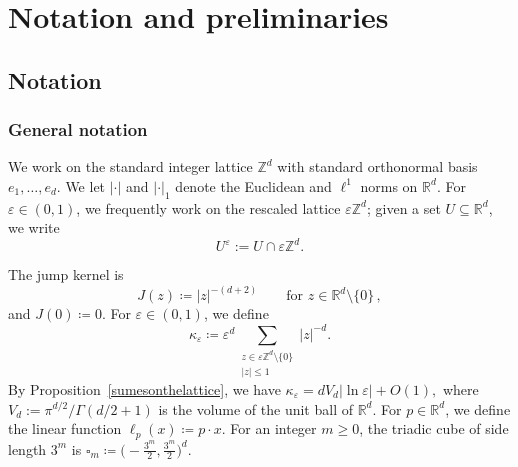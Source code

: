 \documentclass[11pt]{amsart}
\theoremstyle{plain}
\theoremstyle{definition}
\theoremstyle{remark}
\newcommand{\Zd}{\mathbb{Z}^d}
\newcommand{\Rd}{\mathbb{R}^d}
\newcommand{\R}{\mathbb{R}}
\newcommand{\cu}{\square}
\newcommand{\eps}{\varepsilon}
\begin{document}
	
	\section{Notation and preliminaries} \label{sec:notation}
	
	\subsection{Notation} \label{sec:secnotation}
	
	\subsubsection{General notation}
	We work on the standard integer lattice $\Zd$ with standard orthonormal basis $e_1, \ldots, e_d$.
	We let $|\cdot|$ and $|\cdot|_1$ denote the Euclidean and $\ell^1$ norms on $\Rd$.
	For $\eps \in (0,1)$, we frequently work on the rescaled lattice $\eps\Zd$; given a set $U \subseteq \Rd$, we write
	\[
	U^\eps := U \cap \eps \Zd.
	\]
	
	The jump kernel is
	\begin{equation}
		\label{e.J}
		J(z) \coloneqq |z|^{-(d+2)} \qquad \text{for } z \in \Rd \setminus \{0\}\,,
	\end{equation}
	and $J(0) \coloneqq 0$.
	For $\eps \in (0,1)$, we define
	\begin{equation}
		\label{e.kappaeps}
		\kappa_\eps \coloneqq \eps^d \sum_{\substack{z \in \eps\Zd \setminus \{0\} \\ |z| \le 1}} |z|^{-d}.
	\end{equation}
	By Proposition~\ref{sumesonthelattice}, we have
	$\kappa_\eps = d V_d \left| \ln\eps \right| + O(1),$
	where $V_d := \pi^{d/2} / \Gamma (d/2 + 1)$ is the volume of the unit ball of $\R^d$.  For $p \in \Rd$, we define the linear function $\ell_p(x) \coloneqq p \cdot x$.
	For an integer $m \ge 0$, the triadic cube of side length $3^m$ is $\cu_m \coloneqq \bigl(-\tfrac{3^m}{2}, \tfrac{3^m}{2}\bigr)^d$.
	
\end{document}
